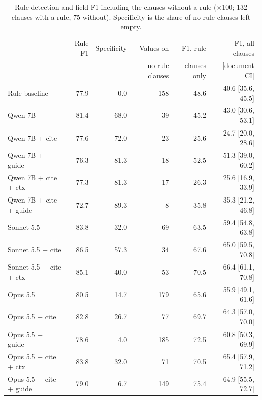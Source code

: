 \documentclass[11pt,a4paper]{article}
\begin{document}
\begin{table}[h]
\centering
\small
\begin{tabular}{lrrrrr}
\toprule
 & Rule F1 & Specificity & Values on & F1, rule & F1, all clauses \\
 & & & no-rule clauses & clauses only & [document CI] \\
\midrule
Rule baseline & 77.9 & 0.0 & 158 & 48.6 & 40.6 [35.6, 45.5] \\
Qwen 7B & 81.4 & 68.0 & 39 & 45.2 & 43.0 [30.6, 53.1] \\
Qwen 7B + cite & 77.6 & 72.0 & 23 & 25.6 & 24.7 [20.0, 28.6] \\
Qwen 7B + guide & 76.3 & 81.3 & 18 & 52.5 & 51.3 [39.0, 60.2] \\
Qwen 7B + cite + ctx & 77.3 & 81.3 & 17 & 26.3 & 25.6 [16.9, 33.9] \\
Qwen 7B + cite + guide & 72.7 & 89.3 & 8 & 35.8 & 35.3 [21.2, 46.8] \\
Sonnet 5.5 & 83.8 & 32.0 & 69 & 63.5 & 59.4 [54.8, 63.8] \\
Sonnet 5.5 + cite & 86.5 & 57.3 & 34 & 67.6 & 65.0 [59.5, 70.8] \\
Sonnet 5.5 + cite + ctx & 85.1 & 40.0 & 53 & 70.5 & 66.4 [61.1, 70.8] \\
Opus 5.5 & 80.5 & 14.7 & 179 & 65.6 & 55.9 [49.1, 61.6] \\
Opus 5.5 + cite & 82.8 & 26.7 & 77 & 69.7 & 64.3 [57.0, 70.0] \\
Opus 5.5 + guide & 78.6 & 4.0 & 185 & 72.5 & 60.8 [50.3, 69.9] \\
Opus 5.5 + cite + ctx & 83.8 & 32.0 & 71 & 70.5 & 65.4 [57.9, 71.2] \\
Opus 5.5 + cite + guide & 79.0 & 6.7 & 149 & 75.4 & 64.9 [55.5, 72.7] \\
\bottomrule
\end{tabular}
\caption{Rule detection and field F1 including the clauses without a rule ($\times$100; 132 clauses with a rule, 75 without). Specificity is the share of no-rule clauses left empty.}
\label{tab:norule}
\end{table}
\end{document}
